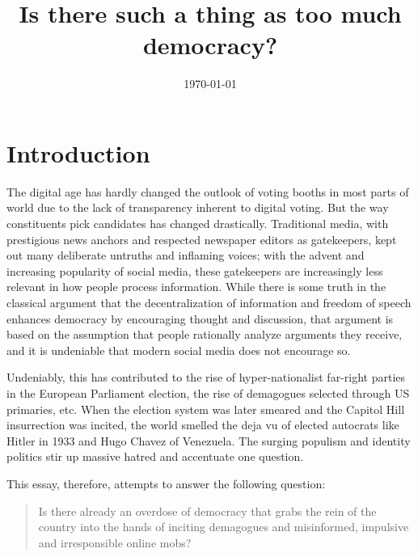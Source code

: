 \documentclass{scrartcl}
\begin{document}
\title{Is there such a thing as too much democracy?}
\author{\today}
\date{}
\maketitle

\section{Introduction}

The digital age has hardly changed the outlook of voting booths in most parts of world due to the lack of transparency inherent to digital voting. But the way constituents pick candidates has changed drastically. Traditional media, with prestigious news anchors and respected newspaper editors as gatekeepers, kept out many deliberate untruths and inflaming voices; with the advent and increasing popularity of social media, these gatekeepers are increasingly less relevant in how people process information. While there is some truth in the classical argument that the decentralization of information and freedom of speech enhances democracy by encouraging thought and discussion, that argument is based on the assumption that people rationally analyze arguments they receive, and it is undeniable that modern social media does not encourage so.

Undeniably, this has contributed to the rise of hyper-nationalist far-right parties in the European Parliament election, the rise of demagogues selected through US primaries, etc. When the election system was later smeared and the Capitol Hill insurrection was incited, the world smelled the deja vu of elected autocrats like Hitler in 1933 and Hugo Chavez of Venezuela. The surging populism and identity politics stir up massive hatred and accentuate one question.

This essay, therefore, attempts to answer the following question:

\begin{quote}
Is there already an overdose of democracy that grabs the rein of the country into the hands of inciting demagogues and misinformed, impulsive and irresponsible online mobs? 
\end{quote}
\end{document}

